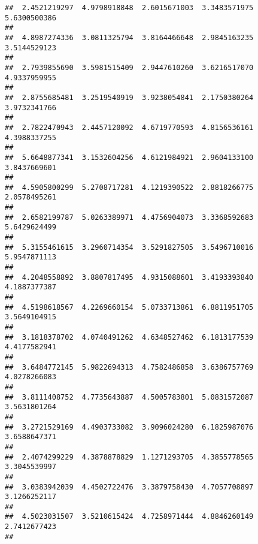 \documentclass[]{article}
\begin{document}
\begin{verbatim}
##  2.4521219297  4.9798918848  2.6015671003  3.3483571975  5.6300500386 
##                                                                       
##  4.8987274336  3.0811325794  3.8164466648  2.9845163235  3.5144529123 
##                                                                       
##  2.7939855690  3.5981515409  2.9447610260  3.6216517070  4.9337959955 
##                                                                       
##  2.8755685481  3.2519540919  3.9238054841  2.1750380264  3.9732341766 
##                                                                       
##  2.7822470943  2.4457120092  4.6719770593  4.8156536161  4.3988337255 
##                                                                       
##  5.6648877341  3.1532604256  4.6121984921  2.9604133100  3.8437669601 
##                                                                       
##  4.5905800299  5.2708717281  4.1219390522  2.8818266775  2.0578495261 
##                                                                       
##  2.6582199787  5.0263389971  4.4756904073  3.3368592683  5.6429624499 
##                                                                       
##  5.3155461615  3.2960714354  3.5291827505  3.5496710016  5.9547871113 
##                                                                       
##  4.2048558892  3.8807817495  4.9315088601  3.4193393840  4.1887377387 
##                                                                       
##  4.5198618567  4.2269660154  5.0733713861  6.8811951705  3.5649104915 
##                                                                       
##  3.1818378702  4.0740491262  4.6348527462  6.1813177539  4.4177582941 
##                                                                       
##  3.6484772145  5.9822694313  4.7582486858  3.6386757769  4.0278266083 
##                                                                       
##  3.8111408752  4.7735643887  4.5005783801  5.0831572087  3.5631801264 
##                                                                       
##  3.2721529169  4.4903733082  3.9096024280  6.1825987076  3.6588647371 
##                                                                       
##  2.4074299229  4.3878878829  1.1271293705  4.3855778565  3.3045539997 
##                                                                       
##  3.0383942039  4.4502722476  3.3879758430  4.7057708897  3.1266252117 
##                                                                       
##  4.5023031507  3.5210615424  4.7258971444  4.8846260149  2.7412677423 
##                                                                       

\end{verbatim}
\end{document}
